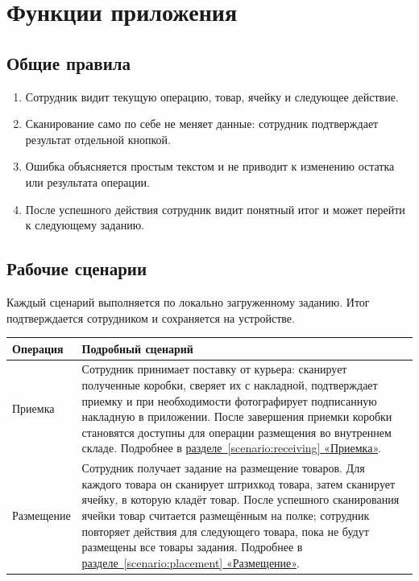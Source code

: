 \section{Функции приложения}

\subsection{Общие правила}

\begin{enumerate}
  \item Сотрудник видит текущую операцию, товар, ячейку и следующее действие.
  \item Сканирование само по себе не меняет данные: сотрудник подтверждает результат отдельной кнопкой.
  \item Ошибка объясняется простым текстом и не приводит к изменению остатка или результата операции.
  \item После успешного действия сотрудник видит понятный итог и может перейти к следующему заданию.
\end{enumerate}

\subsection{Рабочие сценарии}

Каждый сценарий выполняется по локально загруженному заданию. Итог подтверждается сотрудником и сохраняется на устройстве.

\begin{tabularx}{\textwidth}{L{36mm}Y}
\toprule
\textbf{Операция} & \textbf{Подробный сценарий} \\
\midrule
Приемка & Сотрудник принимает поставку от курьера: сканирует полученные коробки, сверяет их с накладной, подтверждает приемку и при необходимости фотографирует подписанную накладную в приложении. После завершения приемки коробки становятся доступны для операции размещения во внутреннем складе. Подробнее в \hyperref[scenario:receiving]{разделе~\ref{scenario:receiving} «Приемка»}. \\
Размещение & Сотрудник получает задание на размещение товаров. Для каждого товара он сканирует штрихкод товара, затем сканирует ячейку, в которую кладёт товар. После успешного сканирования ячейки товар считается размещённым на полке; сотрудник повторяет действия для следующего товара, пока не будут размещены все товары задания. Подробнее в \hyperref[scenario:placement]{разделе~\ref{scenario:placement} «Размещение»}. \\
\bottomrule
\end{tabularx}

